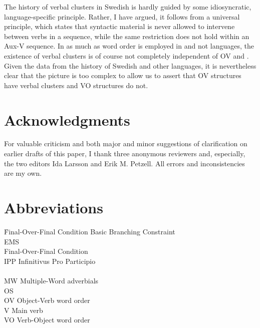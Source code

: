 \documentclass[output=paper, colorlinks, citecolor=brown]{langscibook}
\begin{document}
The history of verbal clusters in Swedish is hardly guided by some idiosyncratic, language-specific principle. Rather, I have argued, it follows from a universal principle, which states that syntactic material is never allowed to intervene between verbs in a  sequence, while the same restriction does not hold within an Aux-V sequence. In as much as  word order is employed in  and not  languages, the existence of verbal clusters is of course not completely independent of OV and . Given the data from the history of Swedish and other languages, it is nevertheless clear that the picture is too complex to allow us to assert that OV structures have verbal clusters and VO structures do not.


\section*{Acknowledgments}


For valuable criticism and both major and minor suggestions of clarification on earlier drafts of this paper, I thank three anonymous reviewers and, especially, the two editors Ida Larsson and Erik M. Petzell. All errors and inconsistencies are my own.


\section*{Abbreviations}
\begin{multicols}{2}
\begin{tabbing}
 \hspace{.5ex} \= Final-Over-Final Condition\kill
{}  \>   Basic Branching Constraint\\
EMS  \>   \\
 \>    Final-Over-Final Condition\\
IPP  \>   Infinitivus Pro Participio\\
  \>   \\
MW   \>  Multiple-Word adverbials\\
OS   \>  \\
OV   \>  Object-Verb word order\\
V    \> Main verb\\
VO   \>  Verb-Object word order
\end{tabbing}
\end{multicols}
\end{document}

